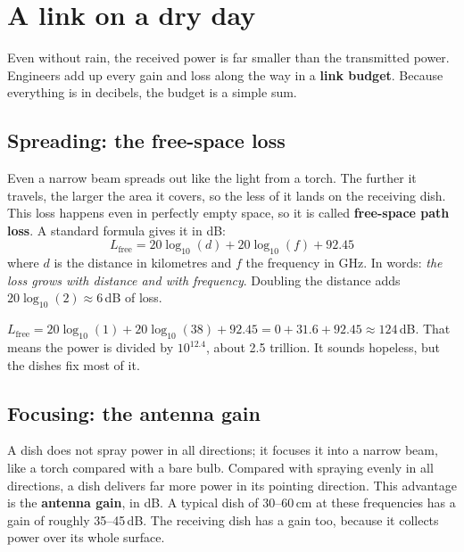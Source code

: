 \documentclass[11pt,a4paper]{article}
\begin{document}
\section{A link on a dry day}
\label{sec:dry}

Even without rain, the received power is far smaller than the transmitted power. Engineers add up
every gain and loss along the way in a \textbf{link budget}. Because everything is in decibels, the
budget is a simple sum.

\subsection{Spreading: the free-space loss}

Even a narrow beam spreads out like the light from a torch. The further it travels, the larger the
area it covers, so the less of it lands on the receiving dish. This loss happens even in perfectly
empty space, so it is called \textbf{free-space path loss}. A standard formula gives it in dB:
\begin{equation}
L_\text{free} = 20\log_{10}(d) + 20\log_{10}(f) + 92.45
\label{eq:fspl}
\end{equation}
where $d$ is the distance in kilometres and $f$ the frequency in GHz. In words: \emph{the loss grows with
distance and with frequency}. Doubling the distance adds $20\log_{10}(2) \approx 6$\,dB of loss.

\begin{example}
$L_\text{free} = 20\log_{10}(1) + 20\log_{10}(38) + 92.45 = 0 + 31.6 + 92.45 \approx 124$\,dB.
That means the power is divided by $10^{12.4}$, about 2.5 trillion. It sounds hopeless, but the dishes
fix most of it.
\end{example}

\subsection{Focusing: the antenna gain}

A dish does not spray power in all directions; it focuses it into a narrow beam, like a torch
compared with a bare bulb. Compared with spraying evenly in all directions, a dish delivers far more
power in its pointing direction. This advantage is the \textbf{antenna gain}, in dB. A typical dish of
30--60\,cm at these frequencies has a gain of roughly 35--45\,dB. The receiving dish has a gain too,
because it collects power over its whole surface.
\end{document}
